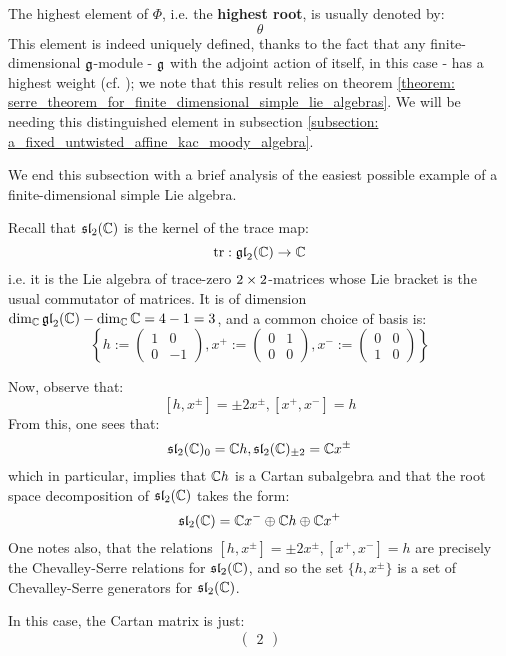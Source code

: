         The highest element of $\Phi$, i.e. the \textbf{highest root}, is usually denoted by:
            $$\theta$$
        This element is indeed uniquely defined, thanks to the fact that any finite-dimensional $\mathfrak{g}$-module - $\mathfrak{g}$ with the adjoint action of itself, in this case - has a highest weight (cf. \cite[Theorem 20.2]{humphreys_lie_algebras}); we note that this result relies on theorem \ref{theorem: serre_theorem_for_finite_dimensional_simple_lie_algebras}. We will be needing this distinguished element in subsection \ref{subsection: a_fixed_untwisted_affine_kac_moody_algebra}.

        We end this subsection with a brief analysis of the easiest possible example of a finite-dimensional simple Lie algebra. 
        \begin{example}[$\sl_2$] \label{example: sl_2}
            Recall that $\mathfrak{sl}_2(\mathbb{C})$ is the kernel of the trace map:
                $$\operatorname{tr}: \mathfrak{gl}_2(\mathbb{C}) \to \mathbb{C}$$
            i.e. it is the Lie algebra of trace-zero $2 \x 2$-matrices whose Lie bracket is the usual commutator of matrices. It is of dimension $\dim_{\mathbb{C}} \mathfrak{gl}_2(\mathbb{C}) - \dim_{\mathbb{C}} \mathbb{C} = 4 - 1 = 3$, and a common choice of basis is:
                $$\left\{ h := \begin{pmatrix} 1 & 0 \\ 0 & -1 \end{pmatrix}, x^+ := \begin{pmatrix} 0 & 1 \\ 0 & 0 \end{pmatrix}, x^- := \begin{pmatrix} 0 & 0 \\ 1 & 0 \end{pmatrix} \right\}$$
                
            Now, observe that:
                $$[h, x^{\pm}] = \pm 2 x^{\pm}, [x^+, x^-] = h$$
            From this, one sees that:
                $$\mathfrak{sl}_2(\mathbb{C})_0 = \mathbb{C} h, \mathfrak{sl}_2(\mathbb{C})_{\pm 2} = \mathbb{C} x^{\pm}$$
            which in particular, implies that $\mathbb{C} h$ is a Cartan subalgebra and that the root space decomposition of $\mathfrak{sl}_2(\mathbb{C})$ takes the form:
                $$\mathfrak{sl}_2(\mathbb{C}) = \mathbb{C} x^- \oplus \mathbb{C} h \oplus \mathbb{C} x^+$$
            One notes also, that the relations $[h, x^{\pm}] = \pm 2 x^{\pm}, [x^+, x^-] = h$ are precisely the Chevalley-Serre relations for $\mathfrak{sl}_2(\mathbb{C})$, and so the set $\{h, x^{\pm}\}$ is a set of Chevalley-Serre generators for $\mathfrak{sl}_2(\mathbb{C})$.
            
            In this case, the Cartan matrix is just:
                $$\begin{pmatrix} 2 \end{pmatrix}$$
        \end{example}

